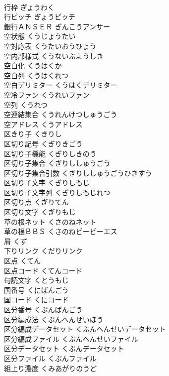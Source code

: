 \documentclass[8pt]{extreport}
\begin{document}
\begin{CJK}{UTF8}{min}
\\	行枠	ぎょうわく	
\\	行ピッチ	ぎょうピッチ	
\\	銀行ＡＮＳＥＲ	ぎんこうアンサー	
\\	空状態	くうじょうたい	
\\	空対応表	くうたいおうひょう	
\\	空内部様式	くうないぶようしき	
\\	空白化	くうはくか	
\\	空白列	くうはくれつ	
\\	空白デリミター	くうはくデリミター	
\\	空冷ファン	くうれいファン	
\\	空列	くうれつ	
\\	空連結集合	くうれんけつしゅうごう	
\\	空アドレス	くうアドレス	
\\	区きり子	くきりし	
\\	区切り記号	くぎりきごう	
\\	区切り子機能	くぎりしきのう	
\\	区切り子集合	くぎりししゅうごう	
\\	区切り子集合引数	くぎりししゅうごうひきすう	
\\	区切り子文字	くぎりしもじ	
\\	区切り子文字列	くぎりしもじれつ	
\\	区切り点	くぎりてん	
\\	区切り文字	くぎりもじ	
\\	草の根ネット	くさのねネット	
\\	草の根ＢＢＳ	くさのねビービーエス	
\\	屑	くず	
\\	下りリンク	くだりリンク	
\\	区点	くてん	
\\	区点コード	くてんコード	
\\	句読文字	くとうもじ	
\\	国番号	くにばんごう	
\\	国コード	くにコード	
\\	区分番号	くぶんばんごう	
\\	区分編成法	くぶんへんせいほう	
\\	区分編成データセット	くぶんへんせいデータセット	
\\	区分編成ファイル	くぶんへんせいファイル	
\\	区分データセット	くぶんデータセット	
\\	区分ファイル	くぶんファイル	
\\	組上り濃度	くみあがりのうど	

\end{CJK}
\end{document}
